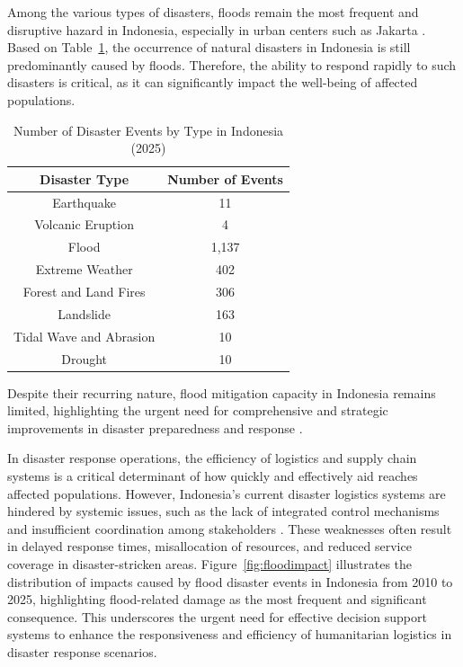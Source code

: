 \documentclass[journal,final,a4paper,twoside,11pt]{IEEEtran}
\begin{document}
Among the various types of disasters, floods remain the most frequent and disruptive hazard in Indonesia, especially in urban centers such as Jakarta \cite{sholihah2020analysis}. 
Based on Table~\ref{tab:disaster2025}, the occurrence of natural disasters in Indonesia is still predominantly caused by floods. Therefore, the ability to respond rapidly to such disasters is critical, as it can significantly impact the well-being of affected populations.


\begin{table}[htbp]
\caption{Number of Disaster Events by Type in Indonesia (2025)}
\begin{center}
\begin{tabular}{|c|c|}
\hline
\textbf{Disaster Type} & \textbf{Number of Events} \\
\hline
Earthquake & 11 \\
\hline
Volcanic Eruption & 4 \\
\hline Flood & 1,137 \\
\hline Extreme Weather & 402 \\
\hline Forest and Land Fires & 306 \\
\hline Landslide & 163 \\
\hline Tidal Wave and Abrasion & 10 \\
\hline Drought & 10 \\
\hline

\end{tabular}
\label{tab:disaster2025}
\end{center}
\end{table}

{}
\newline

Despite their recurring nature, flood mitigation capacity in Indonesia remains limited, highlighting the urgent need for comprehensive and strategic improvements in disaster preparedness and response \cite{riza2020advancing}.

In disaster response operations, the efficiency of logistics and supply chain systems is a critical determinant of how quickly and effectively aid reaches affected populations. However, Indonesia's current disaster logistics systems are hindered by systemic issues, such as the lack of integrated control mechanisms and insufficient coordination among stakeholders \cite{rustian2021implementation}. These weaknesses often result in delayed response times, misallocation of resources, and reduced service coverage in disaster-stricken areas. Figure~\ref{fig:floodimpact} illustrates the distribution of impacts caused by flood disaster events in Indonesia from 2010 to 2025, highlighting flood-related damage as the most frequent and significant consequence. This underscores the urgent need for effective decision support systems to enhance the responsiveness and efficiency of humanitarian logistics in disaster response scenarios.
\end{document}
